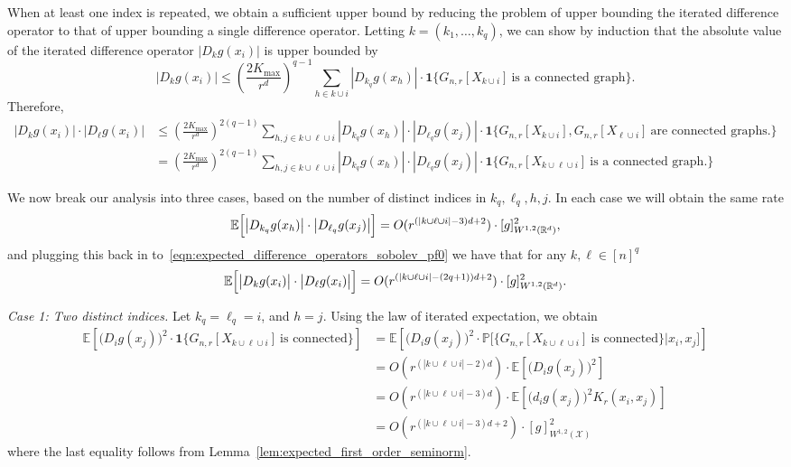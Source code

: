 \documentclass{article}
\newcommand{\Reals}{\mathbb{R}}
\newcommand{\abs}[1]{\left \lvert #1 \right \rvert}
\newcommand{\1}{\mathbf{1}}
\newcommand{\Rd}{\Reals^d}
\newcommand{\Xset}{\mathcal{X}}
\newcommand{\Pbb}{\mathbb{P}}
\newcommand{\Ebb}{\mathbb{E}}
\theoremstyle{alden}
\theoremstyle{aldenthm}
\theoremstyle{definition}
\theoremstyle{remark}
\begin{document}
When at least one index is repeated, we obtain a sufficient upper bound by reducing the problem of upper bounding the iterated difference operator to that of upper bounding a single difference operator. Letting $k = (k_1,\ldots,k_q)$, we can show by induction that the absolute value of the iterated difference operator $\abs{D_kg(x_i)}$ is upper bounded by
\begin{equation*}
\abs{D_kg(x_i)} \leq \left(\frac{2K_{\max}}{r^d}\right)^{q-1} \sum_{h \in k \cup i} \abs{D_{k_q}g(x_h)} \cdot \1\{G_{n,r}[X_{k \cup i}]~\textrm{is a connected graph} \}.
\end{equation*}
Therefore,
\begin{align}
\abs{D_kg(x_i)} \cdot \abs{D_{\ell}g(x_i)} & \leq \left(\frac{2K_{\max}}{r^d}\right)^{2(q - 1)} \sum_{h,j \in k \cup \ell \cup i} \abs{D_{k_q}g(x_h)} \cdot \abs{D_{\ell_q}g(x_j)} \cdot \1\{G_{n,r}[X_{k \cup i}], G_{n,r}[X_{\ell \cup i}]~\textrm{are connected graphs.} \} \nonumber \\
& =  \left(\frac{2K_{\max}}{r^d}\right)^{2(q - 1)} \sum_{h,j \in k \cup \ell \cup i} \abs{D_{k_q}g(x_h)} \cdot \abs{D_{\ell_q}g(x_j)} \cdot \1\{G_{n,r}[X_{k \cup \ell \cup i}] ~\textrm{is a connected graph.} \} \label{eqn:expected_difference_operators_sobolev_pf0}
\end{align}

We now break our analysis into three cases, based on the number of distinct indices in $k_q,\ell_q,h,j$. In each case we will obtain the same rate
\begin{equation*}
\Ebb\Bigl[\abs{D_{k_q}g(x_h)} \cdot \abs{D_{\ell_q}g(x_j)}\Bigr] = O(r^{(\abs{k \cup \ell \cup i} - 3)d + 2}) \cdot [g]_{W^{1,2}(\Rd)}^2,
\end{equation*}
and plugging this back in to~\eqref{eqn:expected_difference_operators_sobolev_pf0} we have that for any $k, \ell \in [n]^q$
\begin{equation*}
\Ebb\Bigl[\bigl|D_{k}g(x_i)\bigr| \cdot \bigl|D_{\ell}g(x_i)\bigr|\Bigr] = O(r^{(\abs{k \cup \ell \cup i} - (2q + 1))d + 2}) \cdot [g]_{W^{1,2}(\Rd)}^2.
\end{equation*}

\textit{Case 1: Two distinct indices.}
Let $k_q = \ell_q = i$, and $h = j$. Using the law of iterated expectation, we obtain
\begin{align*}
\Ebb \left[\bigl(D_{i}g(x_j)\bigr)^2 \cdot \1\{G_{n,r}[X_{k \cup \ell \cup i}] ~\textrm{is connected} \}\right] &= \Ebb \left[\bigl(D_{i}g(x_j)\bigr)^2 \cdot \Pbb\bigl[\{G_{n,r}[X_{k \cup \ell \cup i}] ~\textrm{is connected} \} |x_i,x_j\bigr]\right] \\
& = O(r^{(\abs{k \cup \ell \cup i} - 2)d}) \cdot \Ebb\left[\bigl(D_{i}g(x_j)\bigr)^2\right] \\
& = O(r^{(\abs{k \cup \ell \cup i} - 3)d}) \cdot \Ebb\left[\bigl(d_{i}g(x_j)\bigr)^2K_r(x_i,x_j)\right] \\
& = O(r^{(\abs{k \cup \ell \cup i} - 3)d + 2}) \cdot [g]_{W^{1,2}(\Xset)}^2
\end{align*}
where the last equality follows from Lemma~\ref{lem:expected_first_order_seminorm}.
\end{document}
